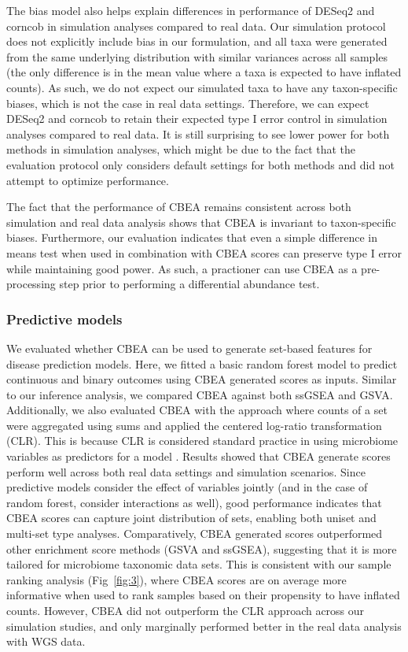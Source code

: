 \documentclass[10pt,letterpaper]{article}
\begin{document}
The bias model also helps explain differences in performance of DESeq2 and corncob in simulation analyses compared to real data. Our simulation protocol does not explicitly include bias in our formulation, and all taxa were generated from the same underlying distribution with similar variances across all samples (the only difference is in the mean value where a taxa is expected to have inflated counts). As such, we do not expect our simulated taxa to have any taxon-specific biases, which is not the case in real data settings. Therefore, we can expect DESeq2 and corncob to retain their expected type I error control in simulation analyses compared to real data. It is still surprising to see lower power for both methods in simulation analyses, which might be due to the fact that the evaluation protocol only considers default settings for both methods and did not attempt to optimize performance. 

The fact that the performance of CBEA remains consistent across both simulation and real data analysis shows that CBEA is invariant to taxon-specific biases. Furthermore, our evaluation indicates that even a simple difference in means test when used in combination with CBEA scores can preserve type I error while maintaining good power. As such, a practioner can use CBEA as a pre-processing step prior to performing a differential abundance test.  

\subsubsection*{Predictive models}
We evaluated whether CBEA can be used to generate set-based features for disease prediction models. Here, we fitted a basic random forest model \cite{breiman2001} to predict continuous and binary outcomes using CBEA generated scores as inputs. Similar to our inference analysis, we compared CBEA against both ssGSEA and GSVA. Additionally, we also evaluated CBEA with the approach where counts of a set were aggregated using sums and applied the centered log-ratio transformation (CLR). This is because CLR is considered standard practice in using microbiome variables as predictors for a model \cite{gloor2017}. Results showed that CBEA generate scores perform well  across both real data settings and simulation scenarios. Since predictive models consider the effect of variables jointly (and in the case of random forest, consider interactions as well), good performance indicates that CBEA scores can capture joint distribution of sets, enabling both uniset and multi-set type analyses. Comparatively, CBEA generated scores outperformed other enrichment score methods (GSVA and ssGSEA), suggesting that it is more tailored for microbiome taxonomic data sets. This is consistent with our sample ranking analysis (Fig~\ref{fig:3}), where CBEA scores are on average more informative when used to rank samples based on their propensity to have inflated counts. However, CBEA did not outperform the CLR approach across our simulation studies, and only marginally performed better in the real data analysis with WGS data. 
\end{document}
